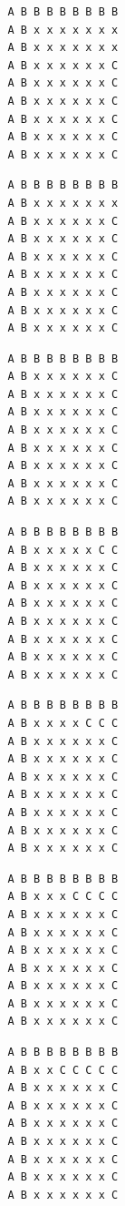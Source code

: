 { \begin{verbatim}
         A B B B B B B B B
         A B x x x x x x x
         A B x x x x x x x
         A B x x x x x x C
         A B x x x x x x C
         A B x x x x x x C
         A B x x x x x x C
         A B x x x x x x C
         A B x x x x x x C
\end{verbatim} }

{ \begin{verbatim}
         A B B B B B B B B
         A B x x x x x x x
         A B x x x x x x C
         A B x x x x x x C
         A B x x x x x x C
         A B x x x x x x C
         A B x x x x x x C
         A B x x x x x x C
         A B x x x x x x C
\end{verbatim} }

{ \begin{verbatim}
         A B B B B B B B B
         A B x x x x x x C
         A B x x x x x x C
         A B x x x x x x C
         A B x x x x x x C
         A B x x x x x x C
         A B x x x x x x C
         A B x x x x x x C
         A B x x x x x x C
\end{verbatim} }

{ \begin{verbatim}
         A B B B B B B B B
         A B x x x x x C C
         A B x x x x x x C
         A B x x x x x x C
         A B x x x x x x C
         A B x x x x x x C
         A B x x x x x x C
         A B x x x x x x C
         A B x x x x x x C
\end{verbatim} }

{ \begin{verbatim}
         A B B B B B B B B
         A B x x x x C C C
         A B x x x x x x C
         A B x x x x x x C
         A B x x x x x x C
         A B x x x x x x C
         A B x x x x x x C
         A B x x x x x x C
         A B x x x x x x C
\end{verbatim} }

{ \begin{verbatim}
         A B B B B B B B B
         A B x x x C C C C
         A B x x x x x x C
         A B x x x x x x C
         A B x x x x x x C
         A B x x x x x x C
         A B x x x x x x C
         A B x x x x x x C
         A B x x x x x x C
\end{verbatim} }

{ \begin{verbatim}
         A B B B B B B B B
         A B x x C C C C C
         A B x x x x x x C
         A B x x x x x x C
         A B x x x x x x C
         A B x x x x x x C
         A B x x x x x x C
         A B x x x x x x C
         A B x x x x x x C
\end{verbatim} }

